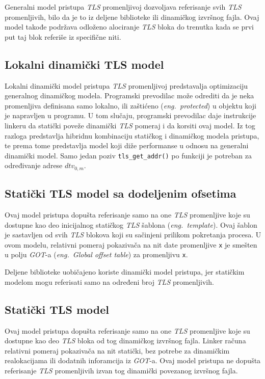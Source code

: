 \documentclass[12pt,oneside]{memoir}
\begin{document}
Generalni model pristupa \emph{TLS} promenljivoj dozvoljava referisanje svih \emph{TLS} promenljivih, bilo da je to iz deljene biblioteke ili dinamičkog izvršnog fajla. Ovaj model takođe podržava odloženo alociranje \emph{TLS} bloka do trenutka kada se prvi put taj blok referiše iz specifične niti.

\subsection{Lokalni dinamički TLS model}

Lokalni dinamički model pristupa \emph{TLS} promenljivoj predstavalja optimizaciju generalnog dinamičkog modela. Programski prevodilac može odrediti da je neka promenljiva definisana samo lokalno, ili zaštićeno (\emph{eng.~protected}) u objektu koji je napravljen u programu. U tom slučaju, programski prevodilac daje instrukcije linkeru da statički poveže dinamički \emph{TLS} pomeraj i da korsiti ovaj model. Iz tog razloga predstavlja hibridnu kombinaciju statičkog i dinamičkog modela pristupa, te prema tome predstavlja model koji diže performanse u odnosu na generalni dinamički model. Samo jedan poziv \texttt{tls\_get\_addr()} po funkciji je potreban za određivanje adrese \texttt{$dtv_{0,m}$}.

\subsection{Statički TLS model sa dodeljenim ofsetima}

Ovaj model pristupa dopušta referisanje samo na one \emph{TLS} promenljive koje su dostupne kao deo inicijalnog statičkog \emph{TLS} šablona (\emph{eng.~template}). Ovaj šablon je sastavljen od svih \emph{TLS} blokova koji su sačinjeni prilikom pokretanja procesa. U ovom modelu, relativni pomeraj pokazivača na nit date promenljive \texttt{x} je smešten u polju \emph{GOT}-a (\emph{eng.~Global offset table}) za promenljivu \texttt{x}.

Deljene biblioteke uobičajeno koriste dinamički model pristupa, jer statičkim modelom mogu referisati samo na određeni broj \emph{TLS} promenljivih.

\subsection{Statički TLS model}

Ovaj model pristupa dopušta referisanje samo na one \emph{TLS} promenljive koje su dostupne kao deo \emph{TLS} bloka od tog dinamičkog izvršnog fajla. Linker računa relativni pomeraj pokazivača na nit statički, bez potrebe za dinamičkim realokacijama ili dodatnih inforamcija iz \emph{GOT}-a. Ovaj model pristupa ne dopušta referisanje \emph{TLS} promenljivih izvan tog dinamički povezanog izvršnog fajla.
\end{document}
